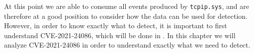 \documentclass{report}
\begin{document}
At this point we are able to consume all events produced by \texttt{tcpip.sys}, and are therefore at a good position to consider how the data can be used for detection. However, in order to know exactly what to detect, it is important to first understand CVE-2021-24086, which will be done in . In this chapter we will analyze CVE-2021-24086 in order to understand exactly what we need to detect.
\end{document}
